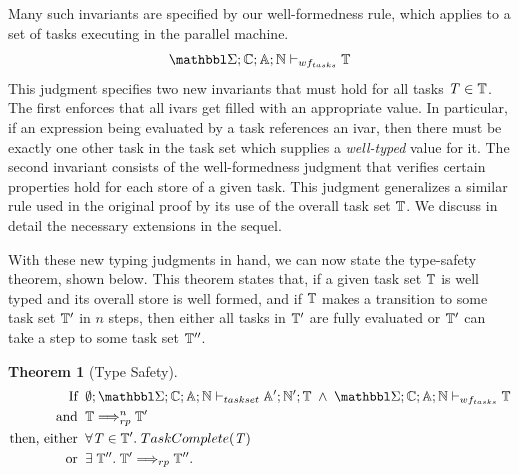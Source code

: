 \documentclass[acmsmall,acmthm=false,nonacm]{acmart}
\newtheorem{theorem}{Theorem}[section]
\theoremstyle{straighttext0}
\theoremstyle{straighttext}
\begin{document}
{Many such invariants are specified by our well-formedness rule, which
applies to a set of tasks executing in the parallel machine.
%
\iftoggle{EXTND}{
  We give the full rule in Appendix~\ref{sec:well-formedness-tasks}.
}{
  The full rule is given in the Appendix of the extended version\cite{ParallelLoCal-tr}.
}
%
\begin{displaymath}
\SENVMAP;\CENVMAP;\AENVMAP;\NENVMAP \storewftasks{\TASKSET}
\end{displaymath}
%
This judgment specifies two new invariants that must hold for all
tasks $\mathit{T} \in \mathbb{T}$.
%
The first enforces that all ivars get filled with an appropriate value.
%
In particular, if an expression being evaluated by a task references an ivar,
then there must be exactly one other task in the task set which supplies a
{\em well-typed} value for it.
%
The second invariant consists of the well-formedness judgment that
verifies certain properties hold for each store of a given task.
%
This judgment generalizes a similar rule used in the original proof
by its use of the overall task set $\mathbb{T}$.
%
We discuss in detail the necessary extensions in the sequel.

With these new typing judgments in hand, we can now state the type-safety
theorem, shown below.
%
This theorem states that, if a given task set $\mathbb{T}$ is well typed
and its overall store is well formed, and if $\mathbb{T}$
makes a transition to some task set $\mathbb{T}'$ in $n$ steps,
then either all tasks in
$\mathbb{T}'$ are fully evaluated or $\mathbb{T}'$ can take
a step to some task set $\mathbb{T}''$.
%
\begin{theorem}[Type Safety]
  \label{theorem:type-safety}
  \begin{displaymath}    
  \begin{aligned}
  \text{If} \;\; & \emptyset;\SENVMAP;\CENVMAP;\AENVMAP;\NENVMAP \vdash_{taskset} \AENVMAP' ; \NENVMAP' ; \TASKSET \; \wedge \; \SENVMAP;\CENVMAP;\AENVMAP;\NENVMAP \storewftasks{\TASKSET} \\
  \text{and} \;\; & \TASKSET \rparstepsto^{n} \TASKSET' \\
  \text{then, either} \;\; & \forall \TASKVAR \in \TASKSET'. \; \taskcomplete{\TASKVAR} \\
  \text{or} \;\; & \exists \; \TASKSET''. \; \TASKSET' \rparstepsto \TASKSET''.
  \end{aligned}
  \end{displaymath}
\end{theorem}

}
\end{document}
